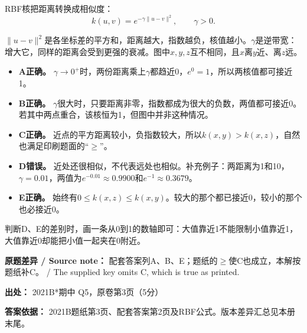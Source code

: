 RBF核把距离转换成相似度：
\[
k(u,v)=e^{-\gamma\|u-v\|^2},\qquad\gamma>0.
\]


\(\|u-v\|^2\)是各坐标差的平方和，距离越大，指数越负，核值越小。\(\gamma\)是逆带宽：增大它，同样的距离会受到更强的衰减。图中\(x,y,z\)互不相同，且\(x\)离\(y\)近、离\(z\)远。



\begin{itemize}

\item \textbf{A正确。} \(\gamma\to0^+\)时，两份距离乘上\(\gamma\)都趋近0，\(e^0=1\)，所以两核值都可接近1。

\item \textbf{B正确。} \(\gamma\)很大时，只要距离非零，指数都成为很大的负数，两值都可接近0。若其中两点重合，该核恒为1，但图中并非这种情况。

\item \textbf{C正确。} 近点的平方距离较小，负指数较大，所以\(k(x,y)>k(x,z)\)，自然也满足印刷题面的“\(\ge\)”。

\item \textbf{D错误。} 近处还很相似，不代表远处也相似。补充例子：两距离为1和10，\(\gamma=0.01\)，两值为\(e^{-0.01}\approx0.9900\)和\(e^{-1}\approx0.3679\)。

\item \textbf{E正确。} 始终有\(0\le k(x,z)\le k(x,y)\)。较大的那个都已接近0，较小的那个也必接近0。

\end{itemize}


判断D、E的差别时，画一条从0到1的数轴即可：大值靠近1不能限制小值靠近1，大值靠近0却能把小值一起夹在0附近。


\textbf{原题差异 / Source note：} 配套答案列A、B、E；题纸的\ensuremath{\ge}使C也成立，本解按题纸补C。 / The supplied key omits C, which is true as printed.


\textbf{出处：} 2021B*期中 Q5，原卷第3页（5分）


\textbf{答案依据：} 2021B题纸第3页、配套答案第2页及RBF公式。版本差异汇总见本册末尾。
